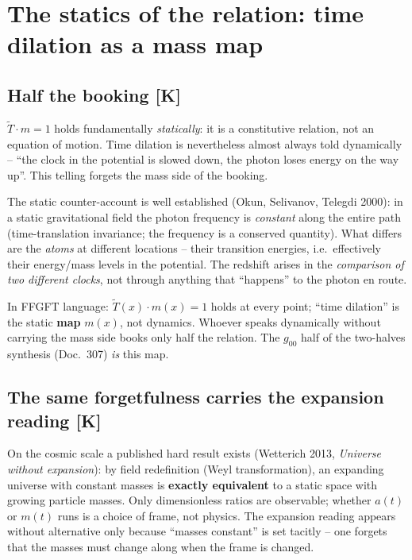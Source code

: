 \documentclass[11pt]{report}
\begin{document}
\chapter{The statics of the relation: time dilation as a mass map}

\section{Half the booking [K]}

$\tilde T \cdot m = 1$ holds fundamentally \emph{statically}: it is
a constitutive relation, not an equation of motion. Time dilation
is nevertheless almost always told dynamically -- \enquote{the
clock in the potential is slowed down, the photon loses energy on
the way up}. This telling forgets the mass side of the booking.

The static counter-account is well established (Okun, Selivanov,
Telegdi 2000): in a static gravitational field the photon frequency
is \emph{constant} along the entire path (time-translation
invariance; the frequency is a conserved quantity). What differs
are the \emph{atoms} at different locations -- their transition
energies, i.e.\ effectively their energy/mass levels in the
potential. The redshift arises in the \emph{comparison of two
different clocks}, not through anything that \enquote{happens} to
the photon en route.

In FFGFT language: $\tilde T(x)\cdot m(x) = 1$ holds at every
point; \enquote{time dilation} is the static \textbf{map} $m(x)$,
not dynamics. Whoever speaks dynamically without carrying the mass
side books only half the relation. The $g_{00}$ half of the
two-halves synthesis (Doc.~307) \emph{is} this map.

\section{The same forgetfulness carries the expansion reading [K]}

On the cosmic scale a published hard result exists (Wetterich 2013,
\emph{Universe without expansion}): by field redefinition (Weyl
transformation), an expanding universe with constant masses is
\textbf{exactly equivalent} to a static space with growing particle
masses. Only dimensionless ratios are observable; whether $a(t)$ or
$m(t)$ runs is a choice of frame, not physics. The expansion
reading appears without alternative only because \enquote{masses
constant} is set tacitly -- one forgets that the masses must change
along when the frame is changed.
\end{document}
